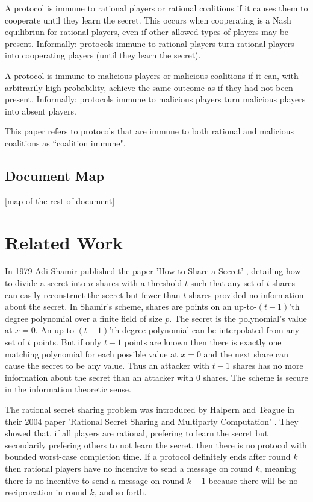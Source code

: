 \documentclass{dalcsthesis}
\begin{document}
A protocol is immune to rational players or rational coalitions if it causes them to cooperate until they learn the secret. This occurs when cooperating is a Nash equilibriun for rational players, even if other allowed types of players may be present. Informally: protocols immune to rational players turn rational players into cooperating players (until they learn the secret).

A protocol is immune to malicious players or malicious coalitions if it can, with arbitrarily high probability, achieve the same outcome as if they had not been present. Informally: protocols immune to malicious players turn malicious players into absent players.

This paper refers to protocols that are immune to both rational and malicious coalitions as ``coalition immune".

\section{Document Map}

[map of the rest of document]




\chapter{Related Work}
\label{sec:RelatedWork}

In 1979 Adi Shamir published the paper 'How to Share a Secret' \cite{shamir79}, detailing how to divide a secret into $n$ shares with a threshold $t$ such that any set of $t$ shares can easily reconstruct the secret but fewer than $t$ shares provided no information about the secret. In Shamir's scheme, shares are points on an up-to-$(t-1)$'th degree polynomial over a finite field of size $p$. The secret is the polynomial's value at $x=0$. An up-to-$(t-1)$'th degree polynomial can be interpolated from any set of $t$ points. But if only $t-1$ points are known then there is exactly one matching polynomial for each possible value at $x=0$ and the next share can cause the secret to be any value. Thus an attacker with $t-1$ shares has no more information about the secret than an attacker with $0$ shares. The scheme is secure in the information theoretic sense.

The rational secret sharing problem was introduced by Halpern and Teague in their 2004 paper 'Rational Secret Sharing and Multiparty Computation' \cite{halpern04}. They showed that, if all players are rational, prefering to learn the secret but secondarily prefering others to not learn the secret, then there is no protocol with bounded worst-case completion time. If a protocol definitely ends after round $k$ then rational players have no incentive to send a message on round $k$, meaning there is no incentive to send a message on round $k-1$ because there will be no reciprocation in round $k$, and so forth.
\end{document}
